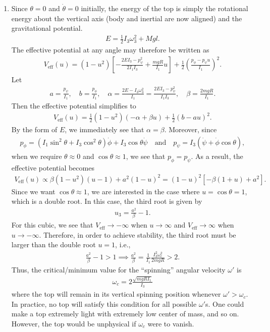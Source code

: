\documentclass{article}
\theoremstyle{definition}
\newcommand{\al}{\alpha}
\newcommand{\be}{\beta}
\newcommand{\f}[2]{\frac{#1}{#2}}
\newcommand{\lp}{\left(}
\newcommand{\rp}{\right)}
\newcommand{\lb}{\left[}
\newcommand{\rb}{\right]}
\begin{document}
\begin{enumerate}[label=(\alph*)]
	
	\item Since $\theta = 0$ and $\dot\theta = 0$ initially, the energy of the top is simply the rotational energy about the vertical axis (body and inertial are now aligned) and the gravitational potential.
	\begin{align*}
	E = \f{1}{2}I_3 \omega_3^2 + Mgl.
	\end{align*} 
	The effective potential at any angle may therefore be written as 
	\begin{align*}
	V_\text{eff}(u) = (1-u^2)\lb -\f{2E I_3 - p_\psi^2}{2I_1 I_3} + \f{mgR}{I_1}u \rb + \f{1}{2}\lp \f{p_\phi - p_\psi u}{I_1} \rp^2.
	\end{align*}
	Let 
	\begin{align*}
	a = \f{p_\psi}{I_1}, \quad b = \f{p_\phi}{I_1}, \quad \al = \f{2E - I_3 \omega_3^2}{I_1} = \f{2E I_3 - p_\psi^2}{I_1I_3}, \quad \be = \f{2mgR}{I_1}.
	\end{align*}
	Then the effective potential simplifies to 
	\begin{align*}
	V_\text{eff}(u) = \f{1}{2}(1-u^2)( -\al + \be u ) + \f{1}{2}(b - au)^2.
	\end{align*}
	By the form of $E$, we immediately see that $\al = \be$. Moreover, since 
	\begin{align*}
	p_\phi = (I_1\sin^2\theta + I_3\cos^2\theta)\dot\phi + I_3\cos\theta\dot\psi \quad \text{and}\quad
	p_\psi = I_3(\dot\psi + \dot\phi \cos\theta),
	\end{align*}
	when we require $\theta \approx 0$ and $\cos\theta \approx 1$, we see that $p_\phi = p_\psi$. As a result, the effective potential becomes
	\begin{align*}
	V_\text{eff}(u) \propto \be(1-u^2)(u-1) + a^2(1-u)^2 = (1-u)^2 \lb -\be(1+u) + a^2 \rb.
	\end{align*} 
	Since we want $\cos\theta\approx 1$, we are interested in the case where $u=\cos\theta = 1$, which is a double root. In this case, the third root is given by 
	\begin{align*}
	u_3 = \f{a^2}{\be} - 1.
	\end{align*}
	For this cubic, we see that $V_\text{eff}\to -\infty$ when $u\to \infty$ and $V_\text{eff}\to \infty$ when $u\to -\infty$. Therefore, in order to achieve stability, the third root must be larger than the double root $u=1$, i.e., 
	\begin{align*}
	\f{a^2}{\be} - 1 > 1 \implies \f{a^2}{\be} = \f{1}{I_1} \f{I_3^2 \omega_c^2}{2mgR} > 2.
	\end{align*} 
	Thus, the critical/minimum value for the ``spinning'' angular velocity $\omega'$ is  
	\begin{align*}
	\boxed{\omega_c = 2{\f{\sqrt{mgR I_1}}{I_3}}}
	\end{align*}
	where the top will remain in its vertical spinning position whenever $\omega' > \omega_c$. In practice, no top will satisfy this condition for all possible $\omega'$s. One could make a top extremely light with extremely low center of mass, and so on. However, the top would be unphysical if $\omega_c$ were to vanish.  
\end{enumerate}
\end{document}
